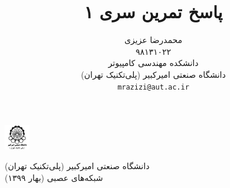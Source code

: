 \documentclass{article}
\title{پاسخ تمرین سری ۱ }
\author{%
  محمدرضا عزیزی\\
  ۹۸۱۳۱۰۲۲ \\
  دانشکده مهندسی کامپیوتر\\
  دانشگاه صنعتی امیرکبیر (پلی‌تکنیک تهران)\\
  \texttt{mrazizi@aut.ac.ir} \\
}
\begin{document}
\begin{minipage}{0.1\textwidth}%
\includegraphics[width=1.1cm]{aut_logo.png}
\end{minipage}%
\hfill%
\begin{minipage}{0.9\textwidth}\raggedleft
دانشگاه صنعتی امیرکبیر (پلی‌تکنیک تهران)\\
شبکه‌های عصبی (بهار ۱۳۹۹)\\
\end{minipage}


\makepertitle




\section{}




\let\oldsection\section
\renewcommand\section{\clearpage\oldsection}








\medskip

\small
\LTR 
\latin
\end{document}
